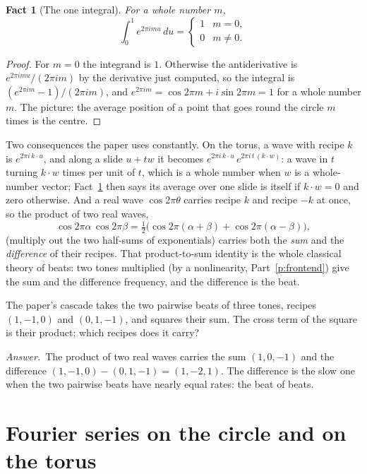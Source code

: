 \documentclass[10pt]{article}
\theoremstyle{plain}
\newtheorem{fact}{Fact}[section]
\theoremstyle{definition}
\newcommand{\answer}{\par\smallskip\noindent\textit{Answer.}\ }
\begin{document}
\begin{fact}[The one integral]
\label{f:oneintegral}
For a whole number $m$,
\[
  \int_0^1 e^{2\pi i m u}\,du=\begin{cases}1 & m=0,\\ 0 & m\ne0.\end{cases}
\]
\end{fact}

\begin{proof}
For $m=0$ the integrand is $1$. Otherwise the antiderivative is
$e^{2\pi imu}/(2\pi im)$ by the derivative just computed, so the integral is
$(e^{2\pi im}-1)/(2\pi im)$, and $e^{2\pi im}=\cos2\pi m+i\sin2\pi m=1$ for
a whole number $m$. The picture: the average position of a point that goes
round the circle $m$ times is the centre.
\end{proof}

Two consequences the paper uses constantly. On the torus, a wave with
recipe $k$ is $e^{2\pi i\,k\cdot u}$, and along a slide $u+tw$ it becomes
$e^{2\pi i\,k\cdot u}\,e^{2\pi i\,t\,(k\cdot w)}$: a wave in $t$ turning
$k\cdot w$ times per unit of $t$, which is a whole number when $w$ is a
whole-number vector; Fact~\ref{f:oneintegral} then says its average over
one slide is itself if $k\cdot w=0$ and zero otherwise. And a real wave
$\cos2\pi\theta$ carries recipe $k$ and recipe $-k$ at once, so the product
of two real waves,
\[
  \cos2\pi\alpha\,\cos2\pi\beta=\tfrac12\big(\cos2\pi(\alpha+\beta)+\cos2\pi(\alpha-\beta)\big),
\]
(multiply out the two half-sums of exponentials) carries both the
\emph{sum} and the \emph{difference} of their recipes. That product-to-sum
identity is the whole classical theory of beats: two tones multiplied (by a
nonlinearity, Part~\ref{p:frontend}) give the sum and the difference
frequency, and the difference is the beat.

\begin{checkyourself}
The paper's cascade takes the two pairwise beats of three tones, recipes
$(1,-1,0)$ and $(0,1,-1)$, and squares their sum. The cross term of the
square is their product; which recipes does it carry?
\answer The product of two real waves carries the sum $(1,0,-1)$ and the
difference $(1,-1,0)-(0,1,-1)=(1,-2,1)$. The difference is the slow one when
the two pairwise beats have nearly equal rates: the beat of beats.
\end{checkyourself}

\section{Fourier series on the circle and on the torus}
\label{p:fourier}
\end{document}
